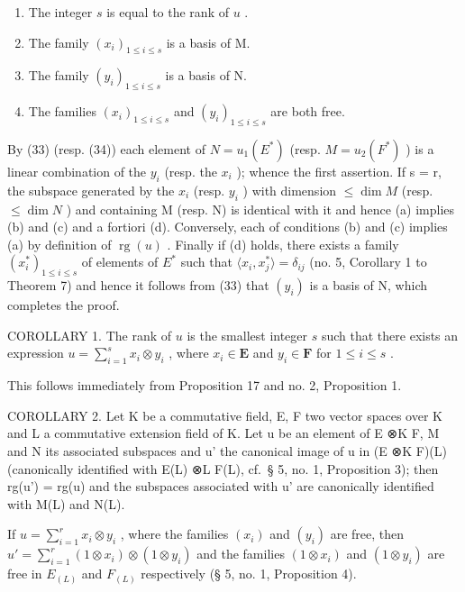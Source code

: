 \begin{enumerate}
\def\labelenumi{(\alph{enumi})}
\item
  The integer \(s\) is equal to the rank of \(u\) .
\item
  The family \((x_{i})_{1\leqslant i\leqslant s}\) is a basis of M.
\item
  The family \((y_{i})_{1\leqslant i\leqslant s}\) is a basis of N.
\item
  The families \((x_{i})_{1\leqslant i\leqslant s}\) and \((y_{i})_{1\leqslant i\leqslant s}\) are both free.
\end{enumerate}

By (33) (resp. (34)) each element of \(N = u_{1}(E^{*})\) (resp. \(M = u_{2}(F^{*})\) ) is a linear combination of the \(y_{i}\) (resp. the \(x_{i}\) ); whence the first assertion. If s = r, the subspace generated by the \(x_{i}\) (resp. \(y_{i}\) ) with dimension \(\leqslant \dim M\) (resp. \(\leqslant \dim N\) ) and containing M (resp. N) is identical with it and hence (a) implies (b) and (c) and a fortiori (d). Conversely, each of conditions (b) and (c) implies (a) by definition of \(\operatorname{rg}(u)\) . Finally if (d) holds, there exists a family \((x_{i}^{*})_{1\leqslant i\leqslant s}\) of elements of \(E^{*}\) such that \(\langle x_{i}, x_{j}^{*}\rangle = \delta_{ij}\) (no. 5, Corollary 1 to Theorem 7) and hence it follows from (33) that \((y_{i})\) is a basis of N, which completes the proof.

COROLLARY 1. The rank of \(u\) is the smallest integer \(s\) such that there exists an expression \(u = \sum_{i=1}^{s} x_i \otimes y_i\) , where \(x_i \in \mathbf{E}\) and \(y_i \in \mathbf{F}\) for \(1 \leqslant i \leqslant s\) .

This follows immediately from Proposition 17 and no. 2, Proposition 1.

COROLLARY 2. Let K be a commutative field, E, F two vector spaces over K and L a commutative extension field of K. Let u be an element of E ⊗K F, M and N its associated subspaces and u' the canonical image of u in (E ⊗K F)(L) (canonically identified with E(L) ⊗L F(L), cf.~§ 5, no. 1, Proposition 3); then rg(u') = rg(u) and the subspaces associated with u' are canonically identified with M(L) and N(L).

If \(u = \sum_{i=1}^{r} x_i \otimes y_i\) , where the families \((x_i)\) and \((y_i)\) are free, then \(u' = \sum_{i=1}^{r} (1 \otimes x_i) \otimes (1 \otimes y_i)\) and the families \((1 \otimes x_i)\) and \((1 \otimes y_i)\) are free in \(E_{(L)}\) and \(F_{(L)}\) respectively (§ 5, no. 1, Proposition 4).

